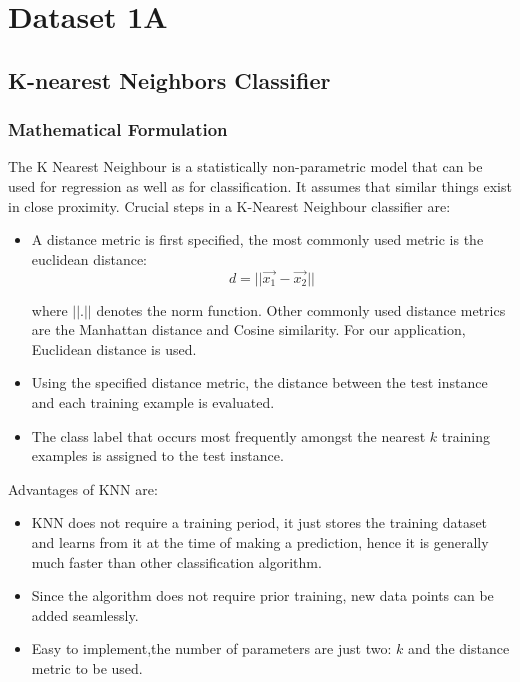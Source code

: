 \documentclass[11pt,a4paper]{article}
\newcommand{\noi}{\noindent}
\begin{document}
{\hypersetup{linkcolor=black}
 \tableofcontents}
\break


\section{Dataset 1A}
\subsection{K-nearest Neighbors Classifier}
\subsubsection{Mathematical Formulation}
\label{sec:1_1}

The K Nearest Neighbour is a statistically non-parametric model that can be used for regression as well as for classification. It assumes that similar things exist in close proximity.  
\noi
Crucial steps in a K-Nearest Neighbour classifier are:
\begin{itemize}
    \itemsep0em
    \item A distance metric is first specified, the most commonly used metric is the euclidean distance:
    \begin{equation}
        d=||\vec{x_1}-\Vec{x_2}||
    \end{equation}
    
    where $||.||$ denotes the norm function. Other commonly used distance metrics are the Manhattan distance and Cosine similarity. For our application, Euclidean distance is used. 
    \item Using the specified distance metric, the distance between the test instance and each training example is evaluated.
    \item The class label that occurs most frequently amongst the nearest $k$ training examples is assigned to the test instance.
\end{itemize}

\noi
Advantages of KNN are:
\begin{itemize}
    \itemsep0em
    \item KNN does not require a training period, it just stores the training dataset and learns from it at the time of making a prediction, hence it is generally much faster than other classification algorithm.
    \item Since the algorithm does not require prior training, new data points can be added seamlessly. 
    \item Easy to implement,the number of parameters are just two: $k$ and the distance metric to be used.
\end{itemize}
\end{document}
